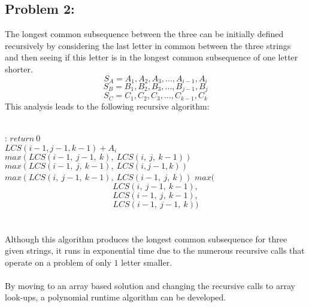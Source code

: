 \documentclass[12pt]{article}
\begin{document}
\subsection*{Problem 2:}
The longest common subsequence between the three can be
initially defined recursively by considering the last 
letter in common between the three strings and then 
seeing if this letter is in the longest common subsequence
of one letter shorter.
\[
S_A = A_1, A_2, A_3,\dots,A_{i-1},A_i
\]
\[
S_B = B_1, B_2, B_3,\dots,B_{j-1},B_j
\]
\[
S_C = C_1, C_2, C_3,\dots,C_{k-1},C_k
\]
This analysis leads to the following recursive algorithm:\\\\
\begin{algorithmic}[H]

:
    \State $return\ 0$
\EndIf\\
    \State$LCS(i-1,j-1,k-1) + A_i$
\Else 
        \State$max(LCS(i-1,\ j-1,\ k),\ LCS(i,\ j,\ k-1))$
    \Else
            \State $max(LCS(i-1,\ j,\ k-1),\ LCS(i, j-1, k))$
        \Else
                \State$max(LCS(i,\ j-1,\ k-1),\ LCS(i-1,\ j,\ k))$
            \Else
                \State $max($\[LCS(i,\ j-1,\ k-1),\]\[LCS(i-1,\ j,\ k-1),\]\[LCS(i-1,\ j-1,\ k))\]
            \EndIf
       \EndIf
   \EndIf
\EndIf  
\EndFunction\\\\
Although this algorithm produces the longest common subsequence for
three given strings, it runs in exponential time due to the numerous
recursive calls that operate on a problem of only $1$ letter smaller.\\\\
By moving to an array based solution and changing the recursive calls 
to array look-ups, a polynomial runtime algorithm can be developed.  
\end{algorithmic}
\end{document}
